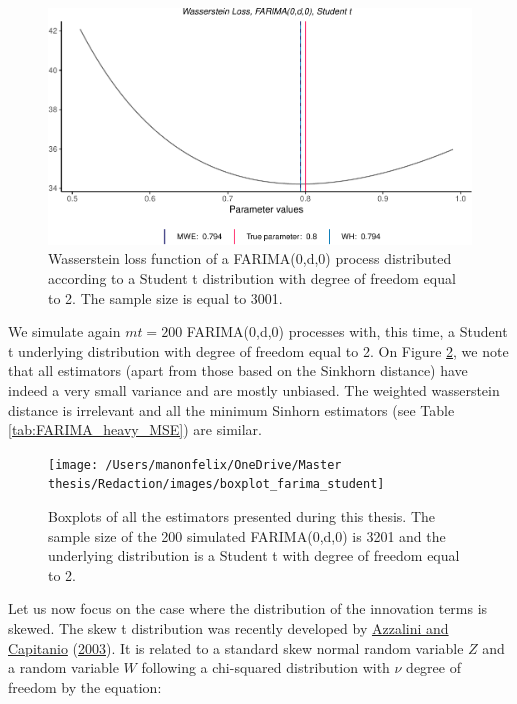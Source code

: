 \documentclass[
  11pt,
]{article}
\begin{document}
\begin{figure}

{\centering \includegraphics[width=0.6\linewidth]{Master_thesis_V1_files/figure-latex/student_t-1} 

}

\caption{Wasserstein loss function of a FARIMA(0,d,0) process distributed according to a Student t distribution with degree of freedom equal to 2. The sample size is equal to 3001.}\label{fig:student_t}
\end{figure}

We simulate again \(mt = 200\) FARIMA(0,d,0) processes with, this time,
a Student t underlying distribution with degree of freedom equal to 2.
On Figure \ref{fig:box_farima_student}, we note that all estimators
(apart from those based on the Sinkhorn distance) have indeed a very
small variance and are mostly unbiased. The weighted wasserstein
distance is irrelevant and all the minimum Sinhorn estimators (see Table
\ref{tab:FARIMA_heavy_MSE}) are similar.

\begin{figure}

{\centering \texttt{[image: /Users/manonfelix/OneDrive/Master thesis/Redaction/images/boxplot\_farima\_student]} 

}

\caption{Boxplots of all the estimators presented during this thesis. The sample size of the 200 simulated FARIMA(0,d,0) is 3201 and the underlying distribution is a Student t with degree of freedom equal to 2.}\label{fig:box_farima_student}
\end{figure}

Let us now focus on the case where the distribution of the innovation
terms is skewed. The skew t distribution was recently developed by
\protect\hyperlink{ref-azzalini2003distributions}{Azzalini and
Capitanio} (\protect\hyperlink{ref-azzalini2003distributions}{2003}). It
is related to a standard skew normal random variable \(Z\) and a random
variable \(W\) following a chi-squared distribution with \(\nu\) degree
of freedom by the equation:
\end{document}
